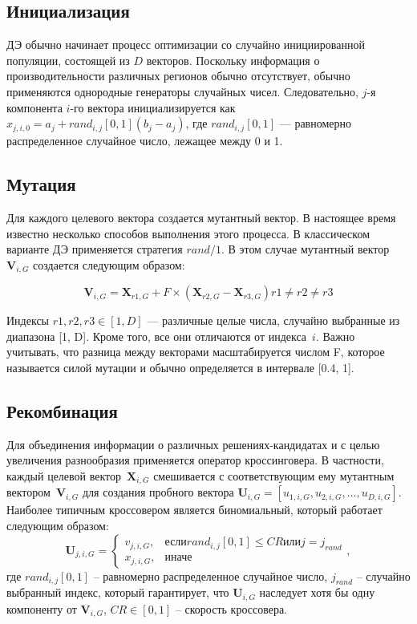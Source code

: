 \subsection{Инициализация}

ДЭ обычно начинает процесс оптимизации со случайно инициированной популяции, состоящей из $D$ векторов. Поскольку информация о производительности различных регионов обычно отсутствует, обычно применяются однородные генераторы случайных чисел. Следовательно, $j$-я компонента $i$-го вектора инициализируется как $x_{j,i,0} = a_{j} + rand_{i,j}[0, 1](b_j − a_j )$, где $rand_{i,j} [0, 1]$ — равномерно распределенное случайное число, лежащее между 0 и 1.

\subsection{Мутация}

Для каждого целевого вектора создается мутантный вектор. В настоящее время известно несколько способов выполнения этого процесса. В классическом варианте ДЭ применяется стратегия $rand/1$. В этом случае мутантный вектор $\textbf{V}_{i,G}$ создается следующим образом:

\begin{equation}\label{eq:de_mut}
  \textbf{V}_{i,G} = \textbf{X}_{r1,G} + F \times (\textbf{X}_{r2,G} − \textbf{X}_{r3,G}) r1 \neq r2 \neq r3
\end{equation}

Индексы $r1, r2, r3 \in [1, D]$ — различные целые числа, случайно выбранные из диапазона [1, D]. Кроме того, все они отличаются от индекса~$i$. Важно учитывать, что разница между векторами масштабируется числом F, которое называется силой мутации и обычно определяется в интервале [0.4, 1].

\subsection{Рекомбинация}

Для объединения информации о различных решениях-кандидатах и с целью увеличения разнообразия применяется оператор кроссинговера. В частности, каждый целевой вектор~$\textbf{X}_{i,G}$ смешивается с соответствующим ему мутантным вектором~$\textbf{V}_{i,G}$ для создания пробного вектора $\textbf{U}_{i,G} = [u_{1,i,G}, u_{2,i,G}, ..., u_{D,i,G}]$. Наиболее типичным кроссовером является биномиальный, который работает следующим образом:
\begin{equation}\label{eq:de_crossover}
  \textbf{U}_{j,i,G} = 
    \begin{cases}
     v_{j,i,G}, & \mbox{если} rand_{i,j}[0, 1] \leq CR \mbox{или} j = j_{rand} \\
     x_{j,i,G}, & \mbox{иначе}
    \end{cases},
\end{equation}
где $rand_{i,j}[0, 1]$ -- равномерно распределенное случайное число, $j_{rand}$ -- случайно выбранный индекс, который гарантирует, что $\textbf{U}_{i,G}$ наследует хотя бы одну компоненту от $\textbf{V}_{i,G}$, $CR \in [0, 1]$ -- скорость кроссовера.

